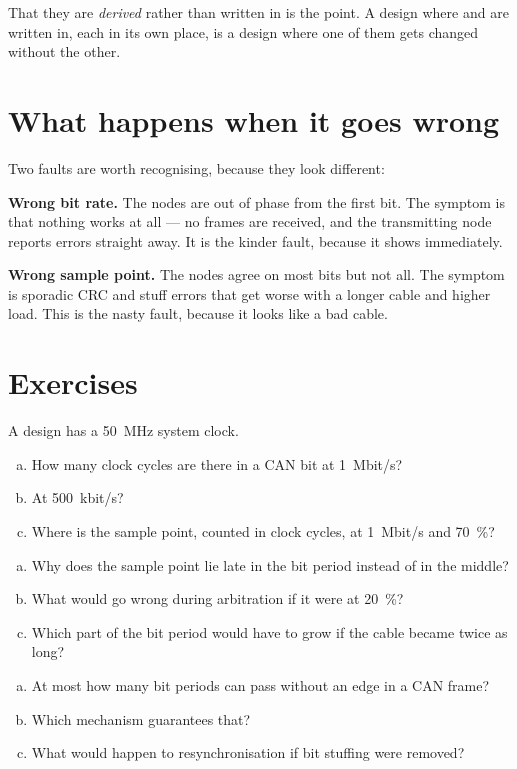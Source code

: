 That they are \emph{derived} rather than written in is the point. A design where  and
 are written in, each in its own place, is a design where one of them gets changed without
the other.

\section{What happens when it goes wrong}

Two faults are worth recognising, because they look different:

\textbf{Wrong bit rate.} The nodes are out of phase from the first bit. The symptom is that nothing
works at all --- no frames are received, and the transmitting node reports errors straight away.
It is the kinder fault, because it shows immediately.

\textbf{Wrong sample point.} The nodes agree on most bits but not all. The symptom is sporadic CRC
and stuff errors that get worse with a longer cable and higher load. This is the nasty fault,
because it looks like a bad cable.

\section*{Exercises}

\label{ex:5:1}
A design has a 50~MHz system clock.
\begin{enumerate}[a)]
  \item How many clock cycles are there in a CAN bit at 1~Mbit/s?
  \item At 500~kbit/s?
  \item Where is the sample point, counted in clock cycles, at 1~Mbit/s and 70~\%?
\end{enumerate}

\label{ex:5:2}
\begin{enumerate}[a)]
  \item Why does the sample point lie late in the bit period instead of in the middle?
  \item What would go wrong during arbitration if it were at 20~\%?
  \item Which part of the bit period would have to grow if the cable became twice as long?
\end{enumerate}

\label{ex:5:3}
\begin{enumerate}[a)]
  \item At most how many bit periods can pass without an edge in a CAN frame?
  \item Which mechanism guarantees that?
  \item What would happen to resynchronisation if bit stuffing were removed?
\end{enumerate}

